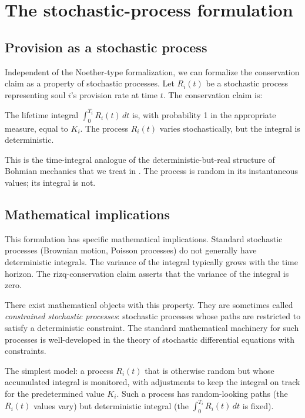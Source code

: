 \section{The stochastic-process formulation}
\label{sec:rizq-stochastic}

\subsection{Provision as a stochastic process}

Independent of the Noether-type formalization, we can formalize the
conservation claim as a property of stochastic processes. Let
$R_i(t)$ be a stochastic process representing soul $i$'s provision
rate at time $t$. The conservation claim is:

\begin{conceptbox}
\label{conc:stochastic-conservation}
The lifetime integral $\int_0^{T_i} R_i(t)\, dt$ is, with probability
1 in the appropriate measure, equal to $K_i$. The process $R_i(t)$
varies stochastically, but the integral is deterministic.
\end{conceptbox}

This is the time-integral analogue of the deterministic-but-real
structure of Bohmian mechanics that we treat in .
The process is random in its instantaneous values; its integral is
not.

\subsection{Mathematical implications}

This formulation has specific mathematical implications. Standard
stochastic processes (Brownian motion, Poisson processes) do not
generally have deterministic integrals. The variance of the
integral typically grows with the time horizon. The
rizq-conservation claim asserts that the variance of the integral
is zero.

There exist mathematical objects with this property. They are
sometimes called \emph{constrained stochastic processes}: stochastic
processes whose paths are restricted to satisfy a deterministic
constraint. The standard mathematical machinery for such processes
is well-developed in the theory of stochastic differential equations
with constraints.

The simplest model: a process $R_i(t)$ that is otherwise random but
whose accumulated integral is monitored, with adjustments to keep
the integral on track for the predetermined value $K_i$. Such a
process has random-looking paths (the $R_i(t)$ values vary) but
deterministic integral (the $\int_0^{T_i} R_i(t)\, dt$ is fixed).


